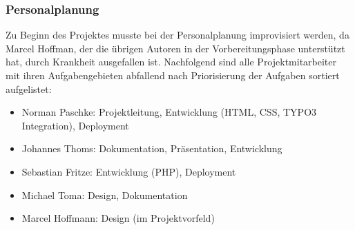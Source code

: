 \subsubsection{Personalplanung}
\label{sec:Personalplanung}
Zu Beginn des Projektes musste bei der Personalplanung improvisiert werden, da Marcel Hoffman, der die übrigen
Autoren in der Vorbereitungsphase unterstützt hat, durch Krankheit ausgefallen ist. Nachfolgend sind
alle Projektmitarbeiter mit ihren Aufgabengebieten abfallend nach Priorisierung der Aufgaben sortiert aufgelistet:
\begin{itemize}
\item Norman Paschke: Projektleitung, Entwicklung (HTML, CSS, TYPO3 Integration), Deployment
\item Johannes Thoms: Dokumentation, Präsentation, Entwicklung
\item Sebastian Fritze: Entwicklung (PHP), Deployment
\item Michael Toma: Design, Dokumentation
\item Marcel Hoffmann: Design (im Projektvorfeld)
\end{itemize}